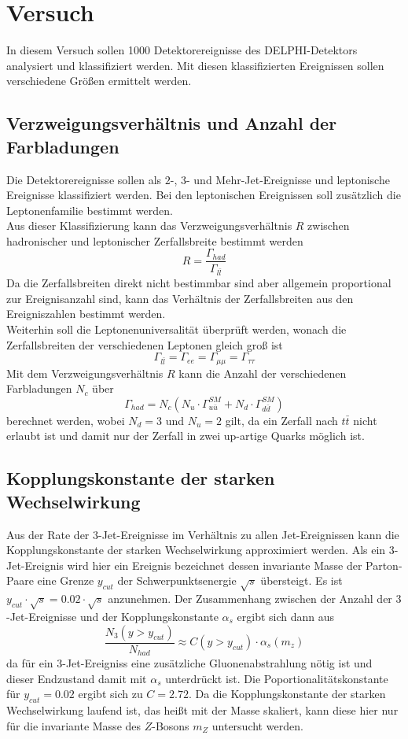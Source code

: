 \documentclass{include/thesisclass3}
\newcommand{\cc}{\cdot}
\begin{document}
\chapter{Versuch}
In diesem Versuch sollen 1000 Detektorereignisse des DELPHI-Detektors analysiert und klassifiziert werden. 
Mit diesen klassifizierten Ereignissen sollen verschiedene Größen ermittelt werden.

\section{Verzweigungsverhältnis und Anzahl der Farbladungen}
Die Detektorereignisse sollen als $2$-, $3$- und Mehr-Jet-Ereignisse und leptonische Ereignisse klassifiziert werden. Bei den leptonischen Ereignissen soll zusätzlich die Leptonenfamilie bestimmt werden.\\
Aus dieser Klassifizierung kann das Verzweigungsverhältnis $R$ zwischen hadronischer und leptonischer Zerfallsbreite bestimmt werden
\[ R = \frac{ \Gamma_{had}}{\Gamma_{l\bar l}}\]
Da die Zerfallsbreiten direkt nicht bestimmbar sind aber allgemein proportional zur Ereignisanzahl sind, kann das Verhältnis der Zerfallsbreiten aus den Ereigniszahlen bestimmt werden.\\
Weiterhin soll die Leptonenuniversalität überprüft werden, wonach die Zerfallsbreiten der verschiedenen Leptonen gleich groß ist
\[ \Gamma_{l\bar l} = \Gamma_{ee} = \Gamma_{\mu\mu} = \Gamma_{\tau\tau}\]
Mit dem Verzweigungsverhältnis $R$ kann die Anzahl der verschiedenen Farbladungen $N_c$ über
\begin{equation}
 \Gamma_{had} = N_c \left( N_u \cc \Gamma_{u\bar u}^{SM} + N_d \cc \Gamma_{d \bar d}^{SM}\right)
\label{farbe}
\end{equation}
berechnet werden, wobei $N_d = 3$ und $N_u = 2$ gilt, da ein Zerfall nach $t \bar t$ nicht erlaubt ist und damit nur der Zerfall in zwei up-artige Quarks möglich ist. 

\section{Kopplungskonstante der starken Wechselwirkung}
Aus der Rate der $3$-Jet-Ereignisse im Verhältnis zu allen Jet-Ereignissen kann die Kopplungskonstante der starken Wechselwirkung approximiert werden. Als ein $3$-Jet-Ereignis wird hier ein Ereignis bezeichnet dessen invariante Masse der Parton-Paare eine Grenze $y_{cut}$ der Schwerpunktsenergie $\sqrt{s}$ übersteigt. Es ist $y_{cut}\cc \sqrt{s} = 0.02 \cc \sqrt{s}$ anzunehmen. Der Zusammenhang zwischen der Anzahl der $3$-Jet-Ereignisse und der Kopplungskonstante $\alpha_s$ ergibt sich dann aus
\[ \frac{N_3(y > y_{cut})}{N_{had}} \approx C(y > y_{cut}) \cc \alpha_s(m_z)\]
da für ein 3-Jet-Ereigniss eine zusätzliche Gluonenabstrahlung nötig ist und dieser Endzustand damit mit $\alpha_s$ unterdrückt ist.
Die Poportionalitätskonstante für $y_{cut} = 0.02$ ergibt sich zu $C = 2.72$. Da die Kopplungskonstante der starken Wechselwirkung laufend ist, das heißt mit der Masse skaliert, kann diese hier nur für die invariante Masse des $Z$-Bosons $m_Z$ untersucht werden.
\end{document}
